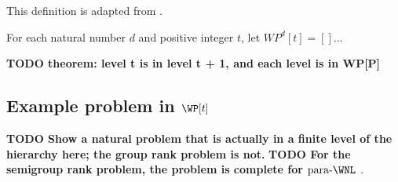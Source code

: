 \documentclass{article}
\newcommand{\todo}[1]{\textbf{TODO #1}}
\newcommand{\dash}{\textnormal{-}}
\begin{document}
This definition is adapted from \autocite[Definition~5.1]{fg06}.

\begin{definition}
  For each natural number $d$ and positive integer $t$, let $WP^d[t] = []$...
\end{definition}

\todo{theorem: level t is in level t + 1, and each level is in WP[P]}




\subsection{Example problem in \texorpdfstring{$\WP[t]$}{WP[t]}}

\todo{Show a natural problem that is actually in a finite level of the hierarchy here; the group rank problem is not.}
\todo{For the semigroup rank problem, the problem is complete for $\textnormal{para} \dash \WNL$ \autocite{est15}}.
\end{document}

